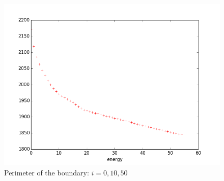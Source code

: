 \documentclass{beamer}
\begin{document}
\begin{frame}[allowframebreaks]
\begin{figure}
        \includegraphics[scale=0.15]{img/perimeter-sparse}
        \caption*{Perimeter of the boundary: $ i = 0, 10, 50 $}
    \end{figure}
\end{frame}
\end{document}
